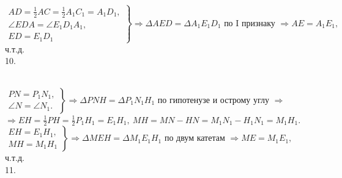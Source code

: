 \documentclass[12pt]{article}
\begin{document}
$\left.\begin{array}{l}AD=\frac{1}{2}AC=\frac{1}{2}A_1C_1=A_1D_1,\\
\angle EDA=\angle E_1D_1A_1,\\
ED=E_1D_1  \end{array}\right\}\Rightarrow \Delta AED=\Delta A_1E_1D_1\text{ по I признаку }\Rightarrow AE=A_1E_1,$ ч.т.д.\\
10. \begin{figure}[ht!]
\end{figure}\\
$\left.\begin{array}{l}PN=P_1N_1,\\
\angle N=\angle N_1. \end{array}\right\}\Rightarrow
\Delta PNH=\Delta P_1N_1H_1\text{ по гипотенузе и острому углу }\Rightarrow $\\$\Rightarrow EH=\frac{1}{2}PH=\frac{1}{2}P_1H_1=E_1H_1,\ MH=MN-HN=M_1N_1-H_1N_1=M_1H_1.$\\
$\left.\begin{array}{l}EH=E_1H_1,\\
MH=M_1H_1  \end{array}\right\}\Rightarrow \Delta MEH=\Delta M_1E_1H_1\text{ по двум катетам }\Rightarrow ME=M_1E_1,$ ч.т.д.\\
11. \begin{figure}[ht!]
\end{figure}\\
\end{document}
